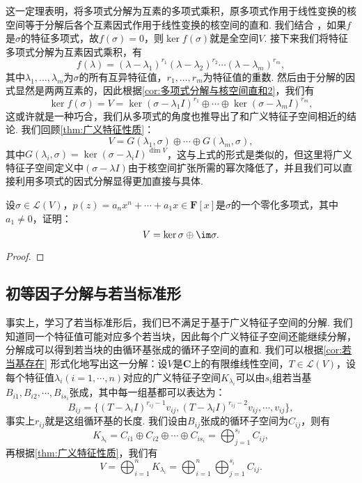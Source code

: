 这一定理表明，将多项式分解为互素的多项式乘积，原多项式作用于线性变换的核空间等于分解后各个互素因式作用于线性变换的核空间的直和. 我们结合 ，如果$f$是$\sigma$的特征多项式，故$f(\sigma)=0$，则$\ker f(\sigma)$就是全空间$V$. 接下来我们将特征多项式分解为互素因式乘积，有
\[f(\lambda)=(\lambda-\lambda_1)^{r_1}(\lambda-\lambda_2)^{r_2}\cdots(\lambda-\lambda_m)^{r_m},\]
其中$\lambda_1,\ldots,\lambda_m$为$\sigma$的所有互异特征值，$r_1,\ldots,r_m$为特征值的重数. 然后由于分解的因式显然是两两互素的，因此根据\autoref{cor:多项式分解与核空间直和2}，我们有
\[\ker f(\sigma)=V=\ker (\sigma-\lambda_1I)^{r_1}\oplus\cdots\oplus\ker (\sigma-\lambda_mI)^{r_m},\]
这或许就是一种巧合，我们从多项式的角度也推导出了和广义特征子空间相近的结论. 我们回顾\autoref{thm:广义特征性质}：
\[V=G(\lambda_1,\sigma)\oplus\cdots\oplus G(\lambda_m,\sigma),\]
其中$G(\lambda_i,\sigma)=\ker (\sigma-\lambda_iI)^{\dim V}$，这与上式的形式是类似的，但这里将广义特征子空间定义中$(\sigma-\lambda I)$由于核空间扩张所需的幂次降低了，并且我们可以直接利用多项式的因式分解显得更加直接与具体.
\begin{example}{}{}
    设$\sigma\in \mathcal{L}(V)$，$p(z)=a_nx^n+\cdots+a_1x\in\mathbf{F}[x]$是$\sigma$的一个零化多项式，其中$a_1\neq 0$，证明：
    \[V=\ker \sigma\oplus\im\sigma.\]
\end{example}

\begin{proof}

\end{proof}

\subsection{初等因子分解与若当标准形}
事实上，学习了若当标准形后，我们已不满足于基于广义特征子空间的分解. 我们知道同一个特征值可能对应多个若当块，因此每个广义特征子空间还能继续分解，分解成可以得到若当块的由循环基张成的循环子空间的直和. 我们可以根据\autoref{cor:若当基存在} 形式化地写出这一分解：设$V$是$\mathbf{C}$上的有限维线性空间，$T\in\mathcal{L}(V)$，设每个特征值$\lambda_i(i=1,\cdots,n)$对应的广义特征子空间$K_{\lambda_i}$可以由$s_i$组若当基$B_{i1},B_{i2},\cdots,B_{is_i}$张成，其中每一组基都可以表达为：
\[B_{ij}=\{(T-\lambda_iI)^{r_{ij}-1}v_{ij},(T-\lambda_iI)^{r_{ij}-2}v_{ij},\cdots,v_{ij}\},\]
事实上$r_{ij}$就是这组循环基的长度. 我们设由$B_{ij}$张成的循环子空间为$C_{ij}$，则有
\[K_{\lambda_i}=C_{i1}\oplus C_{i2}\oplus\cdots\oplus C_{is_i}=\bigoplus_{j=1}^{s_i} C_{ij},\]
再根据\autoref{thm:广义特征性质}，我们有
\begin{equation} \label{eq:19:循环子空间分解}
    V=\bigoplus_{i=1}^n K_{\lambda_i}=\bigoplus_{i=1}^n\bigoplus_{j=1}^{s_i} C_{ij}.
\end{equation}

